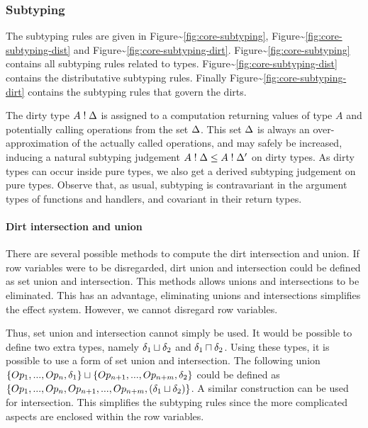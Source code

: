 \documentclass[sigplan,10pt]{acmart}\settopmatter{printfolios=true}
\begin{document}
\subsubsection{Subtyping}\label{subtyping-1}

The subtyping rules are given in
Figure\textasciitilde{}\ref{fig:core-subtyping},
Figure\textasciitilde{}\ref{fig:core-subtyping-dist} and
Figure\textasciitilde{}\ref{fig:core-subtyping-dirt}.
Figure\textasciitilde{}\ref{fig:core-subtyping} contains all subtyping
rules related to types.
Figure\textasciitilde{}\ref{fig:core-subtyping-dist} contains the
distributative subtyping rules. Finally
Figure\textasciitilde{}\ref{fig:core-subtyping-dirt} contains the
subtyping rules that govern the dirts.

The dirty type \(A \mathrel{!} \Delta\) is assigned to a computation returning
values of type \(A\) and potentially calling operations from the set
\(\Delta\). This set \(\Delta\) is always an over-approximation of the
actually called operations, and may safely be increased, inducing a
natural subtyping judgement \(A \mathrel{!} \Delta \leq A \mathrel{!} \Delta'\) on dirty
types. As dirty types can occur inside pure types, we also get a derived
subtyping judgement on pure types. Observe that, as usual, subtyping is
contravariant in the argument types of functions and handlers, and
covariant in their return types.

\paragraph{Dirt intersection and union}

There are several possible methods to compute the dirt intersection and
union. If row variables were to be disregarded, dirt union and
intersection could be defined as set union and intersection. This
methods allows unions and intersections to be eliminated. This has an
advantage, eliminating unions and intersections simplifies the effect
system. However, we cannot disregard row variables.

Thus, set union and intersection cannot simply be used. It would be
possible to define two extra types, namely \(\delta_1 \sqcup \delta_2\)
and \(\delta_1 \sqcap \delta_2\). Using these types, it is
possible to use a form of set union and intersection. The following
union
\(\{Op_1, ..., Op_n, \delta_1\} \sqcup \{Op_{n+1}, ..., Op_{n+m}, \delta_2\}\)
could be defined as
\(\{Op_1, ..., Op_n, Op_{n+1}, ..., Op_{n+m}, (\delta_1 \sqcup \delta_2)\}\).
A similar construction can be used for intersection. This simplifies the
subtyping rules since the more complicated aspects are enclosed within
the row variables.
\end{document}
